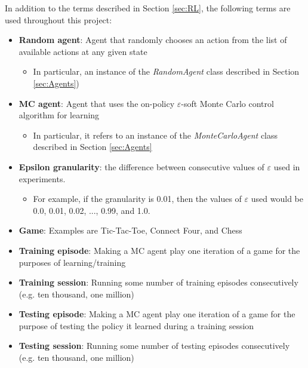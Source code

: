 \documentclass[11pt,a4paper]{report}
\begin{document}
In addition to the terms described in Section \ref{sec:RL}, the following terms are used throughout this project:

\begin{itemize}

	\item \textbf{Random agent}: Agent that randomly chooses an action from the list of available actions at any given state
		\begin{itemize}
			\item In particular, an instance of the \emph{RandomAgent} class described in Section \ref{sec:Agents})
		\end{itemize}

	\item \textbf{MC agent}: Agent that uses the on-policy $\varepsilon$-soft Monte Carlo control algorithm for learning
		\begin{itemize}
			\item In particular, it refers to an instance of the \emph{MonteCarloAgent} class described in Section \ref{sec:Agents}
		\end{itemize}

	\item \textbf{Epsilon granularity}: the difference between consecutive values of $\varepsilon$ used in experiments.
		\begin{itemize}
			\item For example, if the granularity is 0.01, then the values of $\varepsilon$ used would be 0.0, 0.01, 0.02, ..., 0.99, and 1.0.
		\end{itemize}

	\item \textbf{Game}: Examples are Tic-Tac-Toe, Connect Four, and Chess

	\item \textbf{Training episode}: Making a MC agent play one iteration of a game for the purposes of learning/training

	\item \textbf{Training session}: Running some number of training episodes consecutively (e.g. ten thousand, one million)

	\item \textbf{Testing episode}: Making a MC agent play one iteration of a game for the purpose of testing the policy it learned during a training session

	\item \textbf{Testing session}: Running some number of testing episodes consecutively (e.g. ten thousand, one million)

\end{itemize}
\end{document}

